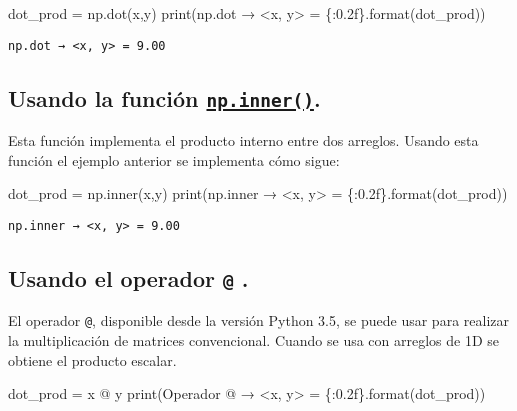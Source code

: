 \documentclass[
  letterpaper,
  DIV=11,
  numbers=noendperiod]{scrreprt}
\newenvironment{Shaded}{\begin{snugshade}}{\end{snugshade}}
\newcommand{\BuiltInTok}[1]{\textcolor[rgb]{0.00,0.23,0.31}{#1}}
\newcommand{\NormalTok}[1]{\textcolor[rgb]{0.00,0.23,0.31}{#1}}
\newcommand{\OperatorTok}[1]{\textcolor[rgb]{0.37,0.37,0.37}{#1}}
\newcommand{\SpecialCharTok}[1]{\textcolor[rgb]{0.37,0.37,0.37}{#1}}
\newcommand{\StringTok}[1]{\textcolor[rgb]{0.13,0.47,0.30}{#1}}
\begin{document}
\begin{Shaded}
\begin{Highlighting}[]
\NormalTok{dot\_prod }\OperatorTok{=}\NormalTok{ np.dot(x,y)}
\BuiltInTok{print}\NormalTok{(}\StringTok{\textquotesingle{}np.dot → \textless{}x, y\textgreater{} = }\SpecialCharTok{\{:0.2f\}}\StringTok{\textquotesingle{}}\NormalTok{.}\BuiltInTok{format}\NormalTok{(dot\_prod))}
\end{Highlighting}
\end{Shaded}

\begin{verbatim}
np.dot → <x, y> = 9.00
\end{verbatim}

\subsection{\texorpdfstring{Usando la función
\href{https://numpy.org/doc/stable/reference/generated/numpy.inner.html}{\texttt{np.inner()}}.}{Usando la función np.inner().}}\label{usando-la-funciuxf3n-np.inner.}

Esta función implementa el producto interno entre dos arreglos. Usando
esta función el ejemplo anterior se implementa cómo sigue:

\begin{Shaded}
\begin{Highlighting}[]
\NormalTok{dot\_prod }\OperatorTok{=}\NormalTok{ np.inner(x,y)}
\BuiltInTok{print}\NormalTok{(}\StringTok{\textquotesingle{}np.inner → \textless{}x, y\textgreater{} = }\SpecialCharTok{\{:0.2f\}}\StringTok{\textquotesingle{}}\NormalTok{.}\BuiltInTok{format}\NormalTok{(dot\_prod))}
\end{Highlighting}
\end{Shaded}

\begin{verbatim}
np.inner → <x, y> = 9.00
\end{verbatim}

\subsection{\texorpdfstring{Usando el operador \texttt{@}
.}{Usando el operador @ .}}\label{usando-el-operador-.}

El operador \texttt{@}, disponible desde la versión Python 3.5, se puede
usar para realizar la multiplicación de matrices convencional. Cuando se
usa con arreglos de 1D se obtiene el producto escalar.

\begin{Shaded}
\begin{Highlighting}[]
\NormalTok{dot\_prod }\OperatorTok{=}\NormalTok{ x }\OperatorTok{@}\NormalTok{ y}
\BuiltInTok{print}\NormalTok{(}\StringTok{\textquotesingle{}Operador @ → \textless{}x, y\textgreater{} = }\SpecialCharTok{\{:0.2f\}}\StringTok{\textquotesingle{}}\NormalTok{.}\BuiltInTok{format}\NormalTok{(dot\_prod))}
\end{Highlighting}
\end{Shaded}
\end{document}
